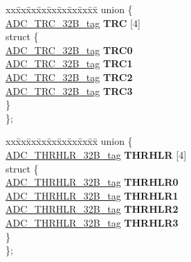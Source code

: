 \begin{DoxyCompactItemize}
\begin{tabbing}
\end{tabbing}\item 
\mbox{\label{structADC__struct__tag_a81477bbc8338f2a30adaba1654efdf6a}} 
\begin{tabbing}
xx\=xx\=xx\=xx\=xx\=xx\=xx\=xx\=xx\=\kill
union \{\\
\>\mbox{\hyperlink{unionADC__TRC__32B__tag}{ADC\_TRC\_32B\_tag}} {\bfseries TRC} \mbox{[}4\mbox{]}\\
\mbox{\label{unionADC__struct__tag_1_1_0D1816_aa804e2b367ca609ef53d787e68e8230e}} 
\>struct \{\\
\>\>\mbox{\hyperlink{unionADC__TRC__32B__tag}{ADC\_TRC\_32B\_tag}} {\bfseries TRC0}\\
\>\>\mbox{\hyperlink{unionADC__TRC__32B__tag}{ADC\_TRC\_32B\_tag}} {\bfseries TRC1}\\
\>\>\mbox{\hyperlink{unionADC__TRC__32B__tag}{ADC\_TRC\_32B\_tag}} {\bfseries TRC2}\\
\>\>\mbox{\hyperlink{unionADC__TRC__32B__tag}{ADC\_TRC\_32B\_tag}} {\bfseries TRC3}\\
\>\} \\
\}; \\

\end{tabbing}\item 
\mbox{\label{structADC__struct__tag_aa5ed44d8c7cb386d1f7bc40242472f19}} 
\begin{tabbing}
xx\=xx\=xx\=xx\=xx\=xx\=xx\=xx\=xx\=\kill
union \{\\
\>\mbox{\hyperlink{unionADC__THRHLR__32B__tag}{ADC\_THRHLR\_32B\_tag}} {\bfseries THRHLR} \mbox{[}4\mbox{]}\\
\mbox{\label{unionADC__struct__tag_1_1_0D1818_aa9edd59d677b8bcf507bd8361b940beb}} 
\>struct \{\\
\>\>\mbox{\hyperlink{unionADC__THRHLR__32B__tag}{ADC\_THRHLR\_32B\_tag}} {\bfseries THRHLR0}\\
\>\>\mbox{\hyperlink{unionADC__THRHLR__32B__tag}{ADC\_THRHLR\_32B\_tag}} {\bfseries THRHLR1}\\
\>\>\mbox{\hyperlink{unionADC__THRHLR__32B__tag}{ADC\_THRHLR\_32B\_tag}} {\bfseries THRHLR2}\\
\>\>\mbox{\hyperlink{unionADC__THRHLR__32B__tag}{ADC\_THRHLR\_32B\_tag}} {\bfseries THRHLR3}\\
\>\} \\
\}; \\


\end{tabbing}
\end{DoxyCompactItemize}
